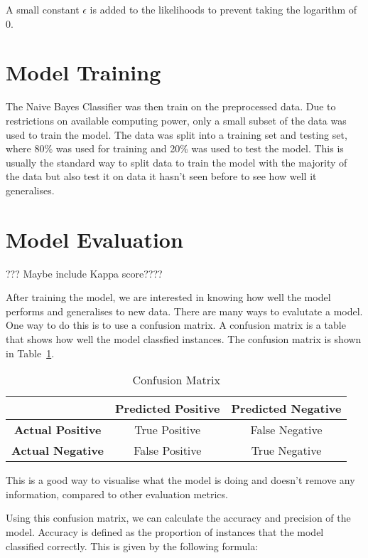 A small constant $\epsilon$ is added to the likelihoods to prevent taking the logarithm of 0.


\section{Model Training}

The Naive Bayes Classifier was then train on the preprocessed data. Due to restrictions on available computing power, only a small subset of the data was used to train the model. The data was split into a training set and testing set, where 80\% was used for training and 20\% was used to test the model. This is usually the standard way to split data to train the model with the majority of the data but also test it on data it hasn't seen before to see how well it generalises.

\section{Model Evaluation}

??? Maybe include Kappa score????

After training the model, we are interested in knowing how well the model performs and generalises to new data. There are many ways to evalutate a model. One way to do this is to use a confusion matrix. A confusion matrix is a table that shows how well the model classfied instances. The confusion matrix is shown in Table~\ref{tab:confusion_matrix}.

\begin{table}[h]
    \centering
    \begin{tabular}{|c|c|c|}
        \hline
        \textbf{} & \textbf{Predicted Positive} & \textbf{Predicted Negative} \\
        \hline
        \textbf{Actual Positive} & True Positive & False Negative \\
        \textbf{Actual Negative} & False Positive & True Negative \\
        \hline
    \end{tabular}
    \caption{Confusion Matrix}
    \label{tab:confusion_matrix}
\end{table}

This is a good way to visualise what the model is doing and doesn't remove any information, compared to other evaluation metrics. 

Using this confusion matrix, we can calculate the accuracy and precision of the model. Accuracy is defined as the proportion of instances that the model classified correctly. This is given by the following formula:

